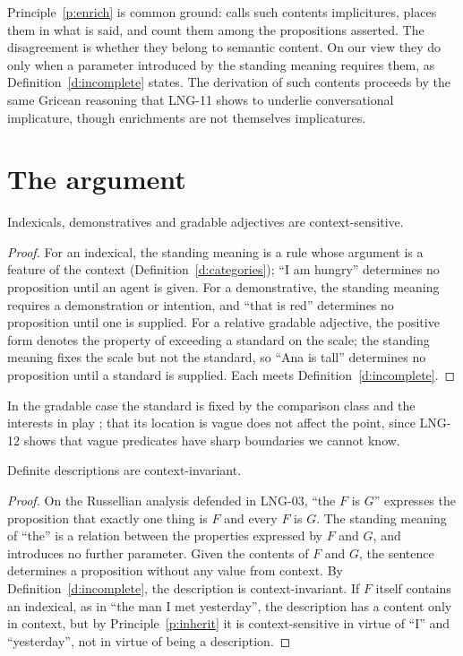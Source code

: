 \documentclass{situationist-preprint}
\begin{document}
Principle~\ref{p:enrich} is common ground: \citet{Bach1994} calls such contents implicitures, \citet{Recanati2004} places them in what is said, and \citet{CappelenLepore2005} count them among the propositions asserted. The disagreement is whether they belong to semantic content. On our view they do only when a parameter introduced by the standing meaning requires them, as Definition~\ref{d:incomplete} states. The derivation of such contents proceeds by the same Gricean reasoning that LNG-11 shows to underlie conversational implicature, though enrichments are not themselves implicatures.

\section{The argument}

\begin{lemma}\label{l:three}
Indexicals, demonstratives and gradable adjectives are context-sensitive.
\end{lemma}

\begin{proof}
For an indexical, the standing meaning is a rule whose argument is a feature of the context (Definition~\ref{d:categories}); \enquote{I am hungry} determines no proposition until an agent is given. For a demonstrative, the standing meaning requires a demonstration or intention, and \enquote{that is red} determines no proposition until one is supplied. For a relative gradable adjective, the positive form denotes the property of exceeding a standard on the scale; the standing meaning fixes the scale but not the standard, so \enquote{Ana is tall} determines no proposition until a standard is supplied. Each meets Definition~\ref{d:incomplete}.
\end{proof}

In the gradable case the standard is fixed by the comparison class and the interests in play \citep{Kennedy2007}; that its location is vague does not affect the point, since LNG-12 shows that vague predicates have sharp boundaries we cannot know.

\begin{lemma}\label{l:descr}
Definite descriptions are context-invariant.
\end{lemma}

\begin{proof}
On the Russellian analysis defended in LNG-03, \enquote{the $F$ is $G$} expresses the proposition that exactly one thing is $F$ and every $F$ is $G$. The standing meaning of \enquote{the} is a relation between the properties expressed by $F$ and $G$, and introduces no further parameter. Given the contents of $F$ and $G$, the sentence determines a proposition without any value from context. By Definition~\ref{d:incomplete}, the description is context-invariant. If $F$ itself contains an indexical, as in \enquote{the man I met yesterday}, the description has a content only in context, but by Principle~\ref{p:inherit} it is context-sensitive in virtue of \enquote{I} and \enquote{yesterday}, not in virtue of being a description.
\end{proof}
\end{document}
